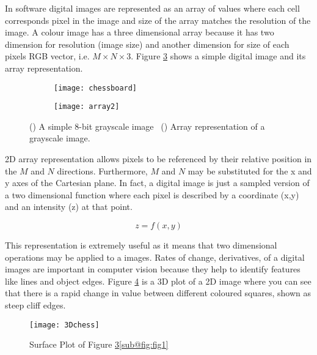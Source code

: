 In software digital images are represented as an array of values where each cell corresponds pixel in the image and size of the array matches the resolution of the image. A colour image has a three dimensional array because it has two dimension for resolution (image size) and another dimension for size of each pixels RGB vector, i.e. $M \times N \times 3$. Figure \ref{fig:2Darray} shows a simple digital image and its array representation.

\begin{figure}[H]
    \centering
    \begin{subfigure}[b]{0.5\linewidth}
      \centering\texttt{[image: chessboard]}
      \caption{\label{fig:fig1}}
    \end{subfigure}%
    \begin{subfigure}[b]{0.5\linewidth}
      \centering\texttt{[image: array2]}
      \caption{\label{fig:fig2}}
    \end{subfigure}
    \caption{() A simple 8-bit grayscale image ~() Array representation of a grayscale image.}
    \label{fig:2Darray}
\end{figure}
  

2D array representation allows pixels to be referenced by their relative position in the $M$ and $N$ directions. Furthermore, $M$ and $N$ may be substituted for the x and y axes of the Cartesian plane. In fact, a digital image is just a sampled version of a two dimensional function where each pixel is described by a coordinate (x,y) and an intensity (z) at that point.

\begin{equation}
    z = f(x,y)
    \label{eq:2Dfunc}
\end{equation}

This representation is extremely useful as it means that two dimensional operations may be applied to a images. Rates of change, derivatives, of a digital images are important in computer vision because they help to identify features like lines and object edges. Figure \ref{fig:3Dplot} is a 3D plot of a 2D image where you can see that there is a rapid change in value between different coloured squares, shown as steep cliff edges. 

\begin{figure}[ht!]
  \centering
  \centering\texttt{[image: 3Dchess]}
  \caption{\label{fig:fig1} Surface Plot of Figure \ref{fig:2Darray}\ref{sub@fig:fig1}}
  \label{fig:3Dplot}
\end{figure}






